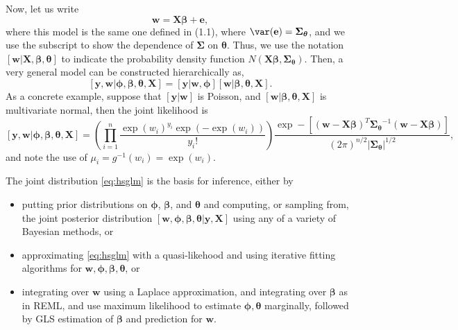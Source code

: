 \documentclass[12pt, titlepage]{article}
\begin{document}
Now, let us write
$$
\mathbf{w} = \mathbf{X}\boldsymbol{\beta} + \mathbf{e},
$$
where this model is the same one defined in (1.1), where $\var(\mathbf{e}) = \boldsymbol{\Sigma}_{\boldsymbol{\theta}}$, and we use the subscript to show the dependence of $\boldsymbol{\Sigma}$ on $\boldsymbol{\theta}$.  Thus, we use the notation $[\mathbf{w}|\mathbf{X},\boldsymbol{\beta},\boldsymbol{\theta}]$ to indicate the probability density function $N(\mathbf{X}\boldsymbol{\beta},\boldsymbol{\Sigma}_{\boldsymbol{\theta}})$.  Then, a very general model can be constructed hierarchically as,
\begin{equation} \label{eq:hsglm}
[\mathbf{y},\mathbf{w}|\boldsymbol{\phi},\boldsymbol{\beta},\boldsymbol{\theta},\mathbf{X}] = [\mathbf{y}|\mathbf{w},\boldsymbol{\phi}][\mathbf{w}|\boldsymbol{\beta},\boldsymbol{\theta},\mathbf{X}].
\end{equation}
As a concrete example, suppose that $[\mathbf{y}|\mathbf{w}]$ is Poisson, and $[\mathbf{w}|\boldsymbol{\beta},\boldsymbol{\theta},\mathbf{X}]$ is multivariate normal, then the joint likelihood is
$$
[\mathbf{y},\mathbf{w}|\boldsymbol{\phi},\boldsymbol{\beta},\boldsymbol{\theta},\mathbf{X}] = \left(\prod_{i=1}^{n}\frac{\exp(w_{i})^{y_{i}}\exp(-\exp(w_i))}{y_{i}!}\right)\frac{\exp-[(\mathbf{w} - \mathbf{X}\boldsymbol{\beta})^{T}\boldsymbol{\Sigma_{\boldsymbol{\theta}}}^{-1}(\mathbf{w} - \mathbf{X}\boldsymbol{\beta})]}{(2\pi)^{n/2}|\boldsymbol{\Sigma_{\boldsymbol{\theta}}}|^{1/2}},
$$
and note the use of $\mu_{i} = g^{-1}(w_{i}) = \exp(w_{i})$.

The joint distribution \ref{eq:hsglm} is the basis for inference, either by
\begin{itemize}
\item putting prior distributions on $\boldsymbol{\phi}$, $\boldsymbol{\beta}$, and $\boldsymbol{\theta}$ and computing, or sampling from, the joint posterior distribution $[\mathbf{w},\boldsymbol{\phi},\boldsymbol{\beta},\boldsymbol{\theta}|\mathbf{y},\mathbf{X}]$ using any of a variety of Bayesian methods, or 
\item approximating \eqref{eq:hsglm} with a quasi-likehood and using iterative fitting algorithms for $\mathbf{w},\boldsymbol{\phi},\boldsymbol{\beta},\boldsymbol{\theta}$, or
\item integrating over $\mathbf{w}$ using a Laplace approximation, and integrating over $\boldsymbol{\beta}$ as in REML, and use maximum likelihood to estimate $\boldsymbol{\phi},\boldsymbol{\theta}$ marginally, followed by GLS estimation of $\boldsymbol{\beta}$ and prediction for $\mathbf{w}$.
\end{itemize}
\end{document}
